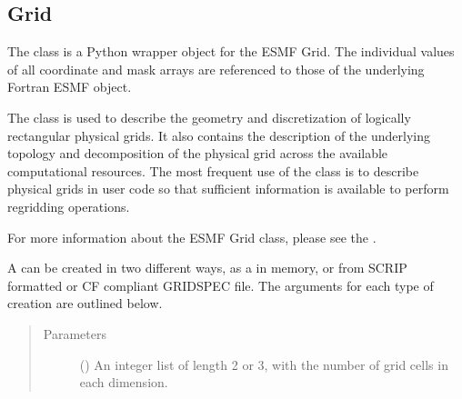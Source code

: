 \documentclass[letterpaper,10pt,english]{sphinxmanual}
\begin{document}
\subsection{Grid}
\label{\detokenize{grid:grid}}\label{\detokenize{grid::doc}}

\begin{fulllineitems}
\label{\detokenize{grid:ESMF.api.grid.Grid}}
The {\hyperref[\detokenize{grid:ESMF.api.grid.Grid}]{}} class is a Python wrapper object for the ESMF Grid.  The individual 
values of all coordinate and mask arrays are referenced to those of the
underlying Fortran ESMF object.

The {\hyperref[\detokenize{grid:ESMF.api.grid.Grid}]{}} class is used to describe the geometry and
discretization of logically rectangular physical grids.  It also contains
the description of the underlying topology and decomposition of the physical
grid across the available computational resources. The most frequent use of
the {\hyperref[\detokenize{grid:ESMF.api.grid.Grid}]{}} class is to describe physical grids in user
code so that sufficient information is available to perform regridding
operations.

For more information about the ESMF Grid class, please see the 
.

A {\hyperref[\detokenize{grid:ESMF.api.grid.Grid}]{}} can be created in two different ways, as a
{\hyperref[\detokenize{grid:ESMF.api.grid.Grid}]{}} in memory, or from SCRIP formatted or CF compliant GRIDSPEC file. The
arguments for each type of {\hyperref[\detokenize{grid:ESMF.api.grid.Grid}]{}} creation are
outlined below.


\begin{quote}\begin{description}
\item[{Parameters}] \leavevmode
{} () \textendash{} An integer list of length 2 or 3, with the
number of grid cells in each dimension.


\end{description}
\end{quote}
\end{fulllineitems}
\end{document}
